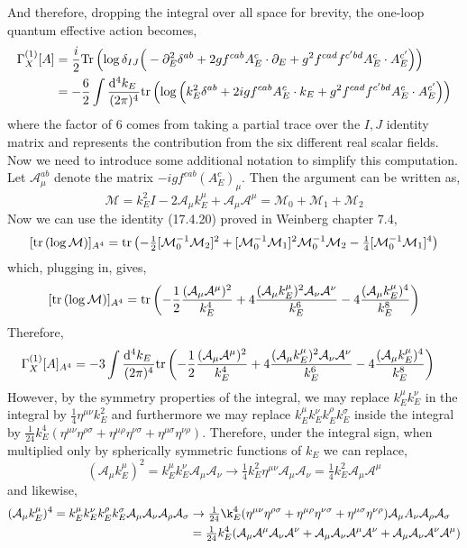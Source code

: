 \documentclass[12pt]{article}
\begin{document}
And therefore, dropping the integral over all space for brevity, the one-loop quantum effective action becomes,
\begin{align*}
\Gamma^{(1)}_X[A] & = \frac{i}{2} \mathrm{Tr}\left( \log{ \delta_{IJ} \Big( - \partial_E^2 \delta^{ab} + 2 g f^{cab} A^{c}_E \cdot \partial_E + g^2 f^{cad} f^{c'bd} A^c_E \cdot A^{c'}_E \Big) } \right)
\\
& = - \frac{6}{2} \int \frac{\mathrm{d}^{4} k_E \:}{(2 \pi)^4} \mathrm{tr} \left( \log{ \Big( k_E^2 \delta^{ab} + 2i g f^{cab} A^{c}_E \cdot k_E + g^2 f^{cad} f^{c'bd} A^c_E \cdot A^{c'}_E \Big) } \right)
\end{align*}
where the factor of $6$ comes from taking a partial trace over the $I,J$ identity matrix and represents the contribution from the six different real scalar fields. Now we need to introduce some additional notation to simplify this computation. 
\newcommand{\A}{\mathcal{A}}
\newcommand{\M}{\mathcal{M}}
Let $\A^{ab}_{\mu}$ denote the matrix $- i g f^{cab} (A^c_E)_{\mu}$. Then the argument can be written as,
\[ \M = k_E^2 I - 2 \A_\mu k_E^\mu + \A_\mu \A^\mu = \M_0 + \M_1 + \M_2 \]
Now we can use the identity (17.4.20) proved in Weinberg chapter 7.4,
\[ [\tr{\log{\M}}]_{A^4} = \tr{- \tfrac{1}{2} [\M_0^{-1} \M_2]^2 + [\M_0^{-1} \M_1]^2 \M_0^{-1} \M_2 - \tfrac{1}{4} [\M_0^{-1} \M_1]^4 } \] 
which, plugging in, gives,
\[ [\tr{\log{\M}}]_{A^4} = \tr{ -\frac{1}{2} \frac{(\A_\mu \A^\mu)^2}{k_E^4} + 4 \frac{(\A_\mu k_E^\mu)^2 \A_\nu \A^\nu}{k_E^6} - 4 \frac{(\A_\mu k_E^\mu)^4}{k_E^8} }  \]
Therefore, 
\begin{align*}
\Gamma^{(1)}_X[A]_{A^4} & = - 3 \int \frac{\dn{4}{k_E}}{(2 \pi)^4} \tr{ -\frac{1}{2} \frac{(\A_\mu \A^\mu)^2}{k_E^4} + 4 \frac{(\A_\mu k_E^\mu)^2 \A_\nu \A^\nu}{k_E^6} - 4 \frac{(\A_\mu k_E^\mu)^4}{k_E^8} } 
\end{align*}
However, by the symmetry properties of the integral, we may replace $k_E^\mu k_E^\nu$ in the integral by $\frac{1}{4} \eta^{\mu \nu} k_E^2$ and furthermore we may replace $k_E^{\mu} k_E^{\nu} k_E^{\rho} k_E^{\sigma}$ inside the integral by $\frac{1}{24} k_E^4 (\eta^{\mu \nu} \eta^{\rho \sigma} + \eta^{\mu \rho} \eta^{\nu \sigma} + \eta^{\mu \sigma} \eta^{\nu \rho})$. 
Therefore, under the integral sign, when multiplied only by spherically symmetric functions of $k_E$ we can replace,
\[ (\A_\mu k_E^\mu)^2 = k_E^\mu k_E^\nu \A_\mu \A_\nu \to \tfrac{1}{4} k_E^2 \eta^{\mu \nu} \A_\mu \A_\nu = \tfrac{1}{4} k_E^2 \A_\mu \A^\mu \]
and likewise,
\begin{align*}
(\A_\mu k_E^\mu)^4 = k_E^{\mu} k_E^{\nu} k_E^{\rho} k_E^{\sigma} \A_\mu \A_\nu \A_\rho \A_\sigma & \to \tfrac{1}{24} \k_E^4 (\eta^{\mu \nu} \eta^{\rho \sigma} + \eta^{\mu \rho} \eta^{\nu \sigma} + \eta^{\mu \sigma} \eta^{\nu \rho})\A_\mu A_\nu \A_\rho \A_\sigma
\\
& = \tfrac{1}{24} k_E^4 ( \A_\mu \A^\mu \A_\nu \A^\nu + \A_\mu \A_\nu \A^\mu \A^\nu + \A_\mu \A_\nu \A^{\nu} \A^{\mu} )
\end{align*}
\end{document}
